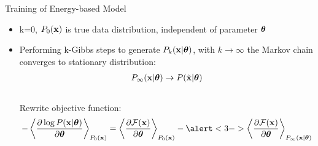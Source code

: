 	\begin{frame}[t]{Training of Energy-based Model}
	 \begin{itemize}
	    \itemsep10pt
	    \item k=0, $P_0(\mathbf{x})$ is true data distribution, independent of parameter $\boldsymbol{\theta}$
	    \item Performing k-Gibbs steps to generate $P_k(\mathbf{x}|\boldsymbol{\theta})$, with $k\rightarrow \infty$ the Markov chain converges to stationary distribution:
		  \begin{align}
		      P_{\infty}(\mathbf{x}|\boldsymbol{\theta}) \rightarrow P(\tilde{\mathbf{x}}|\boldsymbol{\theta})\nonumber
		  \end{align}\\
	    \only<2->
	    {Rewrite objective function:
		  \begin{align}
		   - \left\langle\frac{\partial  \log P(\x|\btheta)}{\partial \boldsymbol{\theta}}\right\rangle_{P_0(\x)} = \left\langle \frac{\partial \mathcal{F}(\x)}{\partial \boldsymbol{\theta}}\right\rangle_{P_0(\x)} -\alert<3->{
					  \left\langle \frac{\partial \mathcal{F}(\x)}{\partial \boldsymbol{\theta}}\right\rangle_{P_{\infty}(\x|\btheta)}\nonumber}
		  \end{align}
	    }
	 \end{itemize}
	  
	 
	\end{frame}
	
